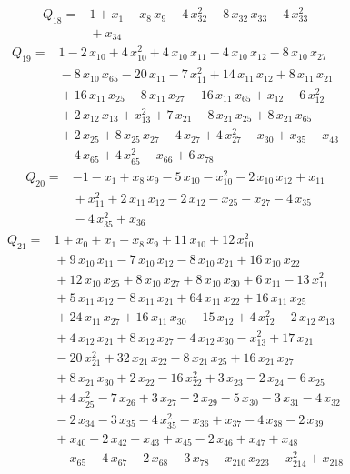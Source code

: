 \documentclass[11pt]{article}
\theoremstyle{definition}\newtheorem{definition}[theorem]{Definition}
\begin{document}
\begin{align*}
Q_{18}={}&1+x_{1}-x_{8}\,x_{9}-4\,x_{32}^{2}-8\,x_{32}\,x_{33}-4\,x_{33}^{2}
\\ &{}+x_{34}
\end{align*}
\begin{align*}
Q_{19}={}&1-2\,x_{10}+4\,x_{10}^{2}+4\,x_{10}\,x_{11}-4\,x_{10}\,x_{12}-8\,x_{10}\,x_{27}
\\ &{}-8\,x_{10}\,x_{65}-20\,x_{11}-7\,x_{11}^{2}+14\,x_{11}\,x_{12}+8\,x_{11}\,x_{21}
\\ &{}+16\,x_{11}\,x_{25}-8\,x_{11}\,x_{27}-16\,x_{11}\,x_{65}+x_{12}-6\,x_{12}^{2}
\\ &{}+2\,x_{12}\,x_{13}+x_{13}^{2}+7\,x_{21}-8\,x_{21}\,x_{25}+8\,x_{21}\,x_{65}
\\ &{}+2\,x_{25}+8\,x_{25}\,x_{27}-4\,x_{27}+4\,x_{27}^{2}-x_{30}+x_{35}-x_{43}
\\ &{}-4\,x_{65}+4\,x_{65}^{2}-x_{66}+6\,x_{78}
\end{align*}
\begin{align*}
Q_{20}={}&-1-x_{1}+x_{8}\,x_{9}-5\,x_{10}-x_{10}^{2}-2\,x_{10}\,x_{12}+x_{11}
\\ &{}+x_{11}^{2}+2\,x_{11}\,x_{12}-2\,x_{12}-x_{25}-x_{27}-4\,x_{35}
\\ &{}-4\,x_{35}^{2}+x_{36}
\end{align*}
\begin{align*}
Q_{21}={}&1+x_{0}+x_{1}-x_{8}\,x_{9}+11\,x_{10}+12\,x_{10}^{2}
\\ &{}+9\,x_{10}\,x_{11}-7\,x_{10}\,x_{12}-8\,x_{10}\,x_{21}+16\,x_{10}\,x_{22}
\\ &{}+12\,x_{10}\,x_{25}+8\,x_{10}\,x_{27}+8\,x_{10}\,x_{30}+6\,x_{11}-13\,x_{11}^{2}
\\ &{}+5\,x_{11}\,x_{12}-8\,x_{11}\,x_{21}+64\,x_{11}\,x_{22}+16\,x_{11}\,x_{25}
\\ &{}+24\,x_{11}\,x_{27}+16\,x_{11}\,x_{30}-15\,x_{12}+4\,x_{12}^{2}-2\,x_{12}\,x_{13}
\\ &{}+4\,x_{12}\,x_{21}+8\,x_{12}\,x_{27}-4\,x_{12}\,x_{30}-x_{13}^{2}+17\,x_{21}
\\ &{}-20\,x_{21}^{2}+32\,x_{21}\,x_{22}-8\,x_{21}\,x_{25}+16\,x_{21}\,x_{27}
\\ &{}+8\,x_{21}\,x_{30}+2\,x_{22}-16\,x_{22}^{2}+3\,x_{23}-2\,x_{24}-6\,x_{25}
\\ &{}+4\,x_{25}^{2}-7\,x_{26}+3\,x_{27}-2\,x_{29}-5\,x_{30}-3\,x_{31}-4\,x_{32}
\\ &{}-2\,x_{34}-3\,x_{35}-4\,x_{35}^{2}-x_{36}+x_{37}-4\,x_{38}-2\,x_{39}
\\ &{}+x_{40}-2\,x_{42}+x_{43}+x_{45}-2\,x_{46}+x_{47}+x_{48}
\\ &{}-x_{65}-4\,x_{67}-2\,x_{68}-3\,x_{78}-x_{210}\,x_{223}-x_{214}^{2}+x_{218}
\end{align*}
\end{document}
